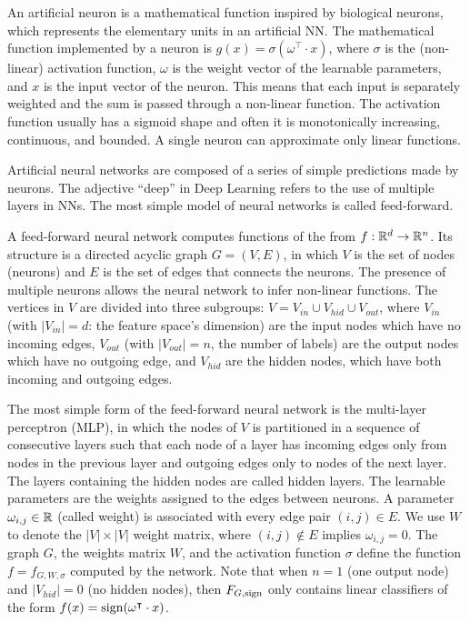 \begin{definition}[Neuron]
	An artificial neuron is a mathematical function inspired by biological neurons, which represents the elementary units in an artificial NN. The mathematical function implemented by a neuron is $g(x) = \sigma(\omega^\intercal \cdot x)$, where $\sigma$ is the (non-linear) activation function, $\omega$ is the weight vector of the learnable parameters, and $x$ is the input vector of the neuron. This means that each input is separately weighted and the sum is passed through a non-linear function. The activation function usually has a sigmoid shape and often it is monotonically increasing, continuous, and bounded. A single neuron can approximate only linear functions.	
\end{definition}

Artificial neural networks are composed of a series of simple predictions made by neurons. The adjective ``deep'' in Deep Learning refers to the use of multiple layers in NNs. The most simple model of neural networks is called feed-forward. 

\begin{definition}
	A feed-forward neural network computes functions of the from $f : \mathbb{R}^d \to \mathbb{R}^n$. Its structure is a directed acyclic graph $G = (V, E)$, in which $V$ is the set of nodes (neurons) and $E$ is the set of edges that connects the neurons. The presence of multiple neurons allows the neural network to infer non-linear functions. The vertices in $V$ are divided into three subgroups: $V = V_{in} \cup V_{hid} \cup V_{out}$, where $V_{in}$ (with $|V_{in}| = d$:	 the feature space's dimension) are the input nodes which have no incoming edges, $V_{out}$ (with $|V_{out}| = n$, the number of labels) are the output nodes which have no outgoing edge, and $V_{hid}$ are the hidden nodes, which have both incoming and outgoing edges.
\end{definition}

The most simple form of the feed-forward neural network is the multi-layer perceptron (MLP), in which the nodes of $V$ is partitioned in a sequence of consecutive layers such that each node of a layer has incoming edges only from
nodes in the previous layer and outgoing edges only to nodes of the next layer.  The layers containing the hidden nodes are called hidden layers. The learnable parameters are the weights assigned to the edges between neurons. 
A parameter $\omega_{i,j} \in \mathbb{R}$ (called weight) is associated with every edge pair $(i, j) \in E$.  We use $W$ to denote the $|V | \times |V |$ weight matrix, where $(i, j) \notin E$ implies $\omega_{i,j} = 0$. The graph $G$, the weights matrix
$W$, and the activation function $\sigma$ define the function $f = f_{G,W,\sigma}$ computed by the network.  Note that when $n = 1$ (one output node) and $|V_{hid}| = 0$ (no hidden nodes), then $F_{G,\operatorname{sign}}$ only contains linear classifiers of the form $f(x) = \operatorname{sign}(\omega^\intercal \cdot x)$. 

